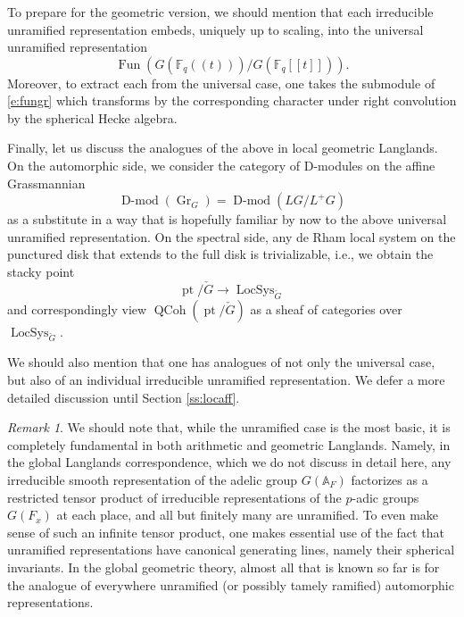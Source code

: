 \documentclass[10pt]{amsart}
\newcommand{\LS}{\on{LocSys}_{\cG}}
\newcommand{\Fqt}{\Fq(\!(t)\!)}
\newcommand{\on}{\operatorname}
\newcommand{\Dmod}{\on{D-mod}}
\newcommand{\Fq}{\mathbb{F}_q}
\newcommand{\Fun}{\on{Fun}}
\theoremstyle{remark}
\newtheorem{re}[subsubsection]{Remark}
\newcommand{\Gr}{\operatorname{Gr}}
\numberwithin{equation}{section}
\newcommand{\cG}{\check{G}}
\newcommand{\QCoh}{\on{QCoh}}
\begin{document}
	\subsubsection{} 
	To prepare for the geometric version, we should mention that each 
	irreducible unramified 
	representation embeds, uniquely up to scaling, into the universal 
	unramified representation 
	\begin{equation} \label{e:fungr}
	    \Fun( G(\Fqt) /G(\Fq[[t]])).
	\end{equation}
	Moreover, to extract 
	each from the universal case, one takes the submodule of \eqref{e:fungr} 
	which transforms by the corresponding character under right convolution by 
	the spherical Hecke algebra. 
	
	
	
	Finally, let us discuss the analogues  of the above in  local geometric 
	Langlands. On the automorphic side, we consider the category of 
	D-modules on the affine Grassmannian  
	\[
	   \Dmod(\Gr_G) = \Dmod(LG/L^+G)
	\]
	 as a substitute in a way that is hopefully familiar by now to the 
	 above universal 
	unramified representation. On the spectral side, any de Rham local system 
	on 
	the punctured disk that extends to the full disk is trivializable, i.e., we 
	obtain the stacky point
	\[
	    \on{pt}/\cG \rightarrow \LS
	\]
	and correspondingly view $\QCoh( \on{pt}/\cG)$ as a sheaf of categories 
	over $\LS$. 
	
	
	We should also mention that one has analogues of not only the universal 
	case, but also of an individual irreducible unramified representation. We defer 
	a more detailed discussion until Section \ref{ss:locaff}. 
	
	\begin{re}We should note that, while the unramified case is the most basic, 
	it is completely fundamental in both arithmetic and geometric Langlands. 
	Namely, in the global Langlands correspondence, which we do not discuss in 
	detail here, any irreducible smooth representation of the adelic group 
	$G(\mathbb{A}_F)$ factorizes as a restricted tensor product of irreducible 
	representations of the $p$-adic groups $G(F_x)$ at each place, and 
 all but finitely many are unramified. To even make sense of such an infinite tensor product, one makes essential use of the fact that unramified representations have canonical generating lines, namely their spherical invariants. In the global geometric theory, almost 
 all that is known so far is for the analogue of everywhere unramified (or 
 possibly tamely ramified) automorphic representations. 
	\end{re}
	
\end{document}
